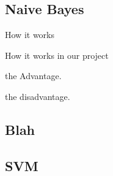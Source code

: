 
\subsection{Naive Bayes}
How it works

How it works in our project

the Advantage.

the disadvantage.
\subsection{Blah}
\subsection{SVM}
